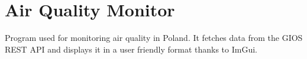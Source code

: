 \chapter{Air Quality Monitor}
\hypertarget{index}{}\label{index}
Program used for monitoring air quality in Poland. It fetches data from the GIOS REST API and displays it in a user friendly format thanks to Im\+Gui. 